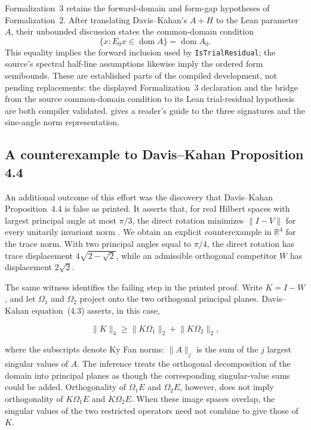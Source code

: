 \documentclass{article}
\begin{document}
Formalization~3 retains the forward-domain and form-gap hypotheses of
Formalization~2.  After translating Davis--Kahan's $A+H$ to the Lean parameter
$A$, their unbounded discussion states the common-domain condition
\[
  \{x:E_0x\in\operatorname{dom}A\}=\operatorname{dom}A_0.
\]
This equality implies the forward inclusion used by \texttt{IsTrialResidual};
the source's spectral half-line assumptions likewise imply the ordered form
semibounds.  These are established parts of the compiled development, not
pending replacements: the displayed Formalization~3 declaration and the bridge
from the source common-domain condition to its Lean trial-residual hypothesis
are both compiler validated.  
gives a reader's guide to the three signatures and the sine-angle norm
representation.

\subsection{A counterexample to Davis--Kahan Proposition 4.4}
\label{sec:prop44}

An additional outcome of this effort was the discovery that
Davis--Kahan Proposition~4.4 is false as printed. It asserts that, for real
Hilbert spaces with largest principal angle at most $\pi/3$, the direct
rotation minimizes $\lVert I-V\rVert$ for every unitarily invariant norm
\citep{davis1970rotation}. We obtain an explicit counterexample in
$\mathbb{R}^4$ for the trace norm. With two principal angles equal to $\pi/4$,
the direct rotation has trace displacement
$4\sqrt{2-\sqrt{2}}$, while an admissible orthogonal competitor $W$ has
displacement $2\sqrt{2}$.

The same witness identifies the failing step in the printed proof. Write
$K=I-W$, and let $\Omega_1$ and $\Omega_2$ project onto the two orthogonal
principal planes. Davis--Kahan equation~(4.3) asserts, in this case,

$$
  \lVert K\rVert_4
  \geq
  \lVert K\Omega_1\rVert_2+\lVert K\Omega_2\rVert_2,
$$

where the subscripts denote Ky Fan norms: $\lVert A\rVert_j$ is the sum of
the $j$ largest singular values of $A$. The inference treats the orthogonal
decomposition of the domain into principal planes as though the corresponding
singular-value sums could be added. Orthogonality of
$\Omega_1E$ and $\Omega_2E$, however, does not imply orthogonality of
$K\Omega_1E$ and $K\Omega_2E$. When these image spaces overlap, the singular
values of the two restricted operators need not combine to give those of
$K$.
\end{document}
